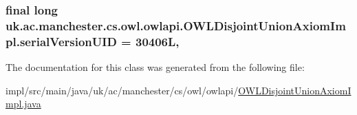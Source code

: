 \hypertarget{classuk_1_1ac_1_1manchester_1_1cs_1_1owl_1_1owlapi_1_1_o_w_l_disjoint_union_axiom_impl_a232b20b1d3e30e17dbc8eaa9c7c1a962}{
\subsubsection[{serial\-Version\-U\-I\-D}]{\setlength{\rightskip}{0pt plus 5cm}final long uk.\-ac.\-manchester.\-cs.\-owl.\-owlapi.\-O\-W\-L\-Disjoint\-Union\-Axiom\-Impl.\-serial\-Version\-U\-I\-D = 30406\-L\hspace{0.3cm}{\ttfamily [static]}, {\ttfamily [private]}}}\label{classuk_1_1ac_1_1manchester_1_1cs_1_1owl_1_1owlapi_1_1_o_w_l_disjoint_union_axiom_impl_a232b20b1d3e30e17dbc8eaa9c7c1a962}


The documentation for this class was generated from the following file\-:\begin{DoxyCompactItemize}
\item 
impl/src/main/java/uk/ac/manchester/cs/owl/owlapi/\hyperlink{_o_w_l_disjoint_union_axiom_impl_8java}{O\-W\-L\-Disjoint\-Union\-Axiom\-Impl.\-java}\end{DoxyCompactItemize}
